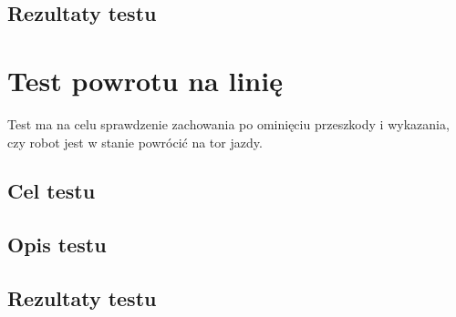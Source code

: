 \subsection{Rezultaty testu}

\section{Test powrotu na linię}
Test ma na celu sprawdzenie zachowania po ominięciu przeszkody i wykazania, czy robot jest w stanie powrócić na tor jazdy.
\subsection{Cel testu}
\subsection{Opis testu}
\subsection{Rezultaty testu}